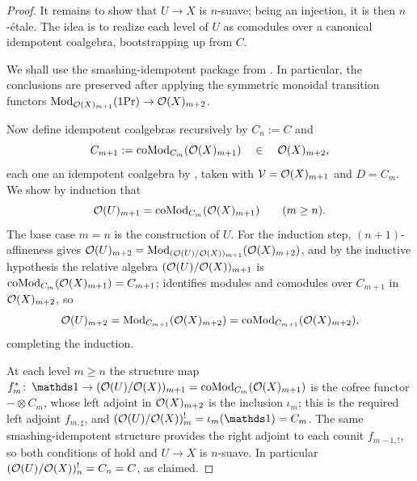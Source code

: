 \documentclass[11pt]{book}
\begin{document}
\begin{proof}
		It remains to show that $U \to X$ is $n$-suave; being an injection, it is then $n$-étale. The idea is to realize each level of $U$ as comodules over a canonical idempotent coalgebra, bootstrapping up from $C$.

		We shall use the smashing-idempotent package from . In particular, the conclusions are preserved after applying the symmetric monoidal transition functors ${\textup{Mod}}_{\mathcal{O}(X)_{m+1}}(1\textup{Pr}) \to \mathcal{O}(X)_{m+2}$.

		Now define idempotent coalgebras recursively by $C_n := C$ and
		\[
			C_{m+1} := {\textup{coMod}}_{C_m}(\mathcal{O}(X)_{m+1}) \quad\in\quad \mathcal{O}(X)_{m+2},
		\]
		each one an idempotent coalgebra by , taken with $\mathcal{V} = \mathcal{O}(X)_{m+1}$ and $D = C_m$. We show by induction that
		\[
			\mathcal{O}(U)_{m+1} = {\textup{coMod}}_{C_m}(\mathcal{O}(X)_{m+1}) \qquad (m \geq n).
		\]
		The base case $m = n$ is the construction of $U$. For the induction step, $(n+1)$-affineness gives $\mathcal{O}(U)_{m+2} = {\textup{Mod}}_{(\mathcal{O}(U)/\mathcal{O}(X))_{m+1}}(\mathcal{O}(X)_{m+2})$, and by the inductive hypothesis the relative algebra $(\mathcal{O}(U)/\mathcal{O}(X))_{m+1}$ is ${\textup{coMod}}_{C_m}(\mathcal{O}(X)_{m+1}) = C_{m+1}$;  identifies modules and comodules over $C_{m+1}$ in $\mathcal{O}(X)_{m+2}$, so
		\[
			\mathcal{O}(U)_{m+2} = {\textup{Mod}}_{C_{m+1}}(\mathcal{O}(X)_{m+2}) = {\textup{coMod}}_{C_{m+1}}(\mathcal{O}(X)_{m+2}),
		\]
		completing the induction.

		At each level $m \geq n$ the structure map $f^*_m\colon \unit \to (\Oo(U)/\Oo(X))_{m+1} = \coMod_{C_m}(\Oo(X)_{m+1})$ is the cofree functor $- \otimes C_m$, whose left adjoint in $\mathcal{O}(X)_{m+2}$ is the inclusion $\iota_m$; this is the required left adjoint $f_{m,\sharp}$, and $(\Oo(U)/\Oo(X))^!_m = \iota_m(\unit) = C_m$. The same smashing-idempotent structure provides the right adjoint to each counit $f_{m-1,!}$, so both conditions of  hold and $U \to X$ is $n$-suave. In particular $(\mathcal{O}(U)/\mathcal{O}(X))^!_n = C_n = C$, as claimed.


\end{proof}
\end{document}
